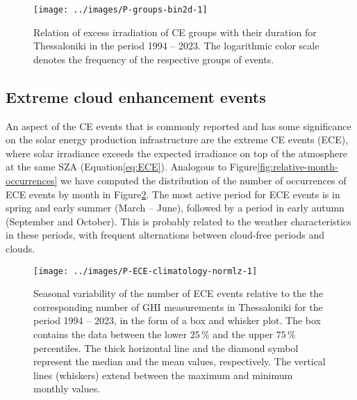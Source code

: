 \documentclass[preprint, 5p,
authoryear]{elsarticle} %
\begin{document}
\begin{figure}

{\centering \texttt{[image: ../images/P-groups-bin2d-1]} 

}

\caption{Relation of excess irradiation of CE groups with their duration for Thessaloniki in the period 1994 -- 2023. The logarithmic color scale denotes the frequency of the respective groups of events.}\label{fig:group-2d}
\end{figure}

\hypertarget{extreme-cloud-enhancement-events}{%
\subsection{Extreme cloud enhancement
events}\label{extreme-cloud-enhancement-events}}

An aspect of the CE events that is commonly reported and has some
significance on the solar energy production infrastructure are the
extreme CE events (ECE), where solar irradiance exceeds the expected
irradiance on top of the atmosphere at the same SZA
(Equation\nobreakspace{}\ref{eq:ECE}). Analogous to
Figure\nobreakspace{}\ref{fig:relative-month-occurrences} we have
computed the distribution of the number of occurrences of ECE events by
month in Figure\nobreakspace{}\ref{fig:relative-month-occurancies-ECE}.
The most active period for ECE events is in spring and early summer
(March -- June), followed by a period in early autumn (September and
October). This is probably related to the weather characteristics in
these periods, with frequent alternations between cloud-free periods and
clouds.

\begin{figure}

{\centering \texttt{[image: ../images/P-ECE-climatology-normlz-1]} 

}

\caption{Seasonal variability of the number of ECE events relative to the the corresponding number of GHI measurements in Thessaloniki for the period 1994 -- 2023, in the form of a box and whisker plot. The box contains the data between the lower $25\,\%$ and the upper $75\,\%$ percentiles. The thick horizontal line and the diamond symbol represent the median and the mean values, respectively. The vertical lines (whiskers) extend between the maximum and minimum monthly values.}\label{fig:relative-month-occurancies-ECE}
\end{figure}
\end{document}
